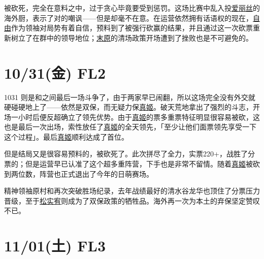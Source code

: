 被砍死，完全在意料之中，过于贪心毕竟要受到惩罚。这场比赛中乱入投\uline{爱丽丝}的海外厨，表示了对的嘲讽——但是却毫不在意。在运营依然拥有话语权的现在，\uline{自由}作为领袖对局势有着自信，预料到了被强行砍赢的结果，并且通过这一次砍票重新树立了在群中的领导地位；\uline{末原}的清场政策开场遭到了挫败也是不可避免的。

\section{10/31(金) FL2}


1031 则是和之间最后一场斗争了，由于两家早已闹翻，所以这场完全没有外交就硬碰硬地上了——依然是双保，而无疑力保\uline{真姬}。破天荒地拿出了强烈的斗志，开场一小时后便反超确立了领先优势。由于\uline{真姬}的票多重票特征明显很容易被砍，这也是最后一次出场，索性放任了\uline{真姬}的全天领先，「至少让他们面票领先享受一下这个过程」。最后\uline{真姬}顺利达成了首位。

但是结局又是很容易预料的，被砍死了。此次拼尽了全力，实票220+，战胜了分票的；但是运营早已认准了这个超多重阵营，下手也是非常不留情。随着\uline{真姬}被砍到两位数，阵营也正式退出了今年的日萌赛场。

精神领袖原村和再次突破胜场纪录，去年战绩最好的清水谷龙华也顶住了分票压力晋级，至于\uline{松实宥}则成为了双保政策的牺牲品。海外再一次为本土的弃保坚定赞叹不已。

\section{11/01(土) FL3}


